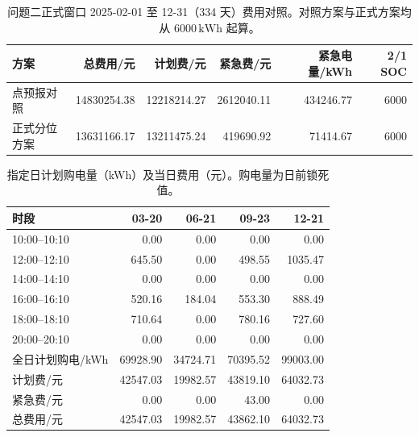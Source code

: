 \begin{table}[htbp]
  \centering
  \caption{问题二正式窗口 2025-02-01 至 12-31（334 天）费用对照。对照方案与正式方案均从 \(6000\,\mathrm{kWh}\) 起算。}
  \label{tab:q2-year}
  \begin{tabular}{lrrrrr}
    \toprule
    方案 & 总费用/元 & 计划费/元 & 紧急费/元 & 紧急电量/kWh & 2/1 SOC \\
    \midrule
    点预报对照 & 14830254.38 & 12218214.27 & 2612040.11 & 434246.77 & 6000 \\
    正式分位方案 & 13631166.17 & 13211475.24 & 419690.92 & 71414.67 & 6000 \\
    \bottomrule
  \end{tabular}
\end{table}

\begin{table}[htbp]
  \centering
  \caption{指定日计划购电量（kWh）及当日费用（元）。购电量为日前锁死值。}
  \label{tab:q2-specified}
  \begin{tabular}{lrrrr}
    \toprule
    时段 & 03-20 & 06-21 & 09-23 & 12-21 \\
    \midrule
    10:00--10:10 & 0.00 & 0.00 & 0.00 & 0.00 \\
    12:00--12:10 & 645.50 & 0.00 & 498.55 & 1035.47 \\
    14:00--14:10 & 0.00 & 0.00 & 0.00 & 0.00 \\
    16:00--16:10 & 520.16 & 184.04 & 553.30 & 888.49 \\
    18:00--18:10 & 710.64 & 0.00 & 780.16 & 727.60 \\
    20:00--20:10 & 0.00 & 0.00 & 0.00 & 0.00 \\
    \midrule
    全日计划购电/kWh & 69928.90 & 34724.71 & 70395.52 & 99003.00 \\
    计划费/元 & 42547.03 & 19982.57 & 43819.10 & 64032.73 \\
    紧急费/元 & 0.00 & 0.00 & 43.00 & 0.00 \\
    总费用/元 & 42547.03 & 19982.57 & 43862.10 & 64032.73 \\
    \bottomrule
  \end{tabular}
\end{table}
